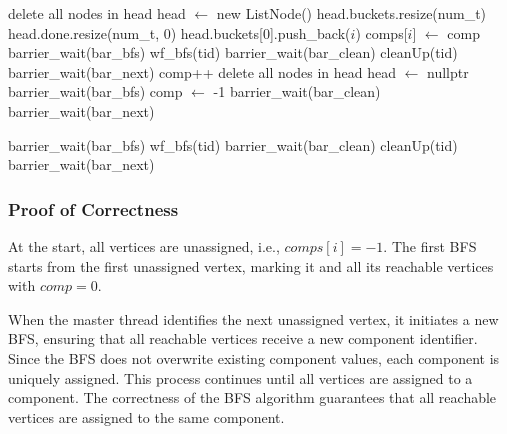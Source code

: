\begin{algorithm}
\caption{Main Connected Components (CC) Function}
\label{cc_algo1}
\begin{algorithmic}[1]
                    \State delete all nodes in head
                \EndWhile
                \State head $\gets$ new ListNode()
                \State head.buckets.resize(num\_t)
                \State head.done.resize(num\_t, 0)
                \State head.buckets[0].push\_back($i$)
                \State comps[$i$] $\gets$ comp
                \State barrier\_wait(bar\_bfs)
                \State wf\_bfs(tid)
                \State barrier\_wait(bar\_clean)
                \State cleanUp(tid)
                \State barrier\_wait(bar\_next)
                \State comp++
            \EndIf
        \EndFor
            \State delete all nodes in head
        \EndWhile
        \State head $\gets$ nullptr
        \State barrier\_wait(bar\_bfs)
        \State comp $\gets$ -1
        \State barrier\_wait(bar\_clean)
        \State barrier\_wait(bar\_next)
    \EndProcedure
\end{algorithmic}
\end{algorithm}
    
\begin{algorithm}
\caption{Helper Function for CC Computation}
\label{cc_algo1_helper}
\begin{algorithmic}[1]
            \State barrier\_wait(bar\_bfs)
            \State wf\_bfs(tid)
            \State barrier\_wait(bar\_clean)
            \State cleanUp(tid)
            \State barrier\_wait(bar\_next)
        \EndWhile
    \EndProcedure
\end{algorithmic}
\end{algorithm}

\subsubsection{Proof of Correctness}

At the start, all vertices are unassigned, i.e., $comps[i] = -1$. The first BFS starts from the first unassigned vertex, marking it and all its reachable vertices with $comp = 0$.

When the master thread identifies the next unassigned vertex, it initiates a new BFS, ensuring that all reachable vertices receive a new component identifier. Since the BFS does not overwrite existing component values, each component is uniquely assigned. This process continues until all vertices are assigned to a component. The correctness of the BFS algorithm guarantees that all reachable vertices are assigned to the same component.

